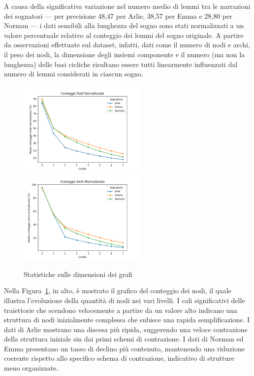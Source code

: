 A causa della significativa variazione nel numero medio di lemmi tra le narrazioni dei sognatori — per precisione
48,47 per Arlie, 38,57 per Emma e 28,80 per Norman — i dati sensibili alla lunghezza del sogno sono stati normalizzati a un
valore percentuale relativo al conteggio dei lemmi del sogno originale.
A partire da osservazioni effettuate sul dataset, infatti, dati come il numero di nodi e archi, il peso dei nodi,
la dimensione degli insiemi componente e il numero (ma non la lunghezza) delle basi cicliche risultano essere tutti
linearmente influenzati dal numero di lemmi considerati in ciascun sogno.

\newpage

\begin{figure}
    \vspace{-5pt}
    \includegraphics[width=0.55\textwidth]{Immagini/conteggio_nodi_normalizzato}
    \includegraphics[width=0.55\textwidth]{Immagini/conteggio_archi_normalizzato}
    \caption{Statistiche sulle dimensioni dei grafi}\label{fig:node_edge_count}
    \vspace{-5pt}
\end{figure}

Nella Figura~\ref{fig:node_edge_count}, in alto, è mostrato il grafico del conteggio dei nodi, il quale illustra
l'evoluzione della quantità di nodi nei vari livelli.
I cali significativi delle traiettorie che scendono velocemente a partire da un valore alto indicano una struttura
di nodi inizialmente complessa che subisce una rapida semplificazione.
I dati di Arlie mostrano una discesa più ripida, suggerendo una veloce contrazione della struttura iniziale sin
dai primi schemi di contrazione.
I dati di Norman ed Emma presentano un tasso di declino più contenuto, mantenendo una riduzione coerente rispetto
allo specifico schema di contrazione, indicativo di strutture meno organizzate.

